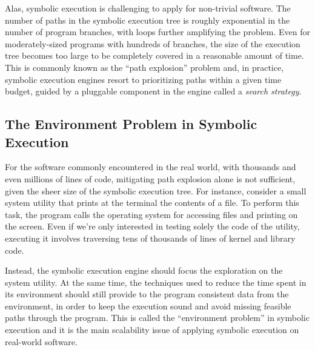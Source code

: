 


Alas, symbolic execution is challenging to apply for non-trivial software.  The number of paths in the symbolic execution tree is roughly exponential in the number of program branches, with loops further amplifying the problem.  Even for moderately-sized programs with hundreds of branches, the size of the execution tree becomes too large to be completely covered in a reasonable amount of time.
%
This is commonly known as the ``path explosion'' problem and, in practice, symbolic execution engines resort to prioritizing paths within a given time budget, guided by a pluggable component in the engine called a \emph{search strategy}.


\subsection{The Environment Problem in Symbolic Execution}

For the software commonly encountered in the real world, with thousands and even millions of lines of code, mitigating path explosion alone is not sufficient, given the sheer size of the symbolic execution tree.
%
For instance, consider a small system utility that prints at the terminal the contents of a file.  To perform this task, the program calls the operating system for accessing files and printing on the screen.
%
Even if we're only interested in testing solely the code of the utility, executing it involves traversing tens of thousands of lines of kernel and library code.

Instead, the symbolic execution engine should focus the exploration on the system utility.  At the same time, the techniques used to reduce the time spent in its environment should still provide to the program consistent data from the environment, in order to keep the execution sound and avoid missing feasible paths through the program.
%
This is called the ``environment problem'' in symbolic execution and it is the main scalability issue of applying symbolic execution on real-world software.

